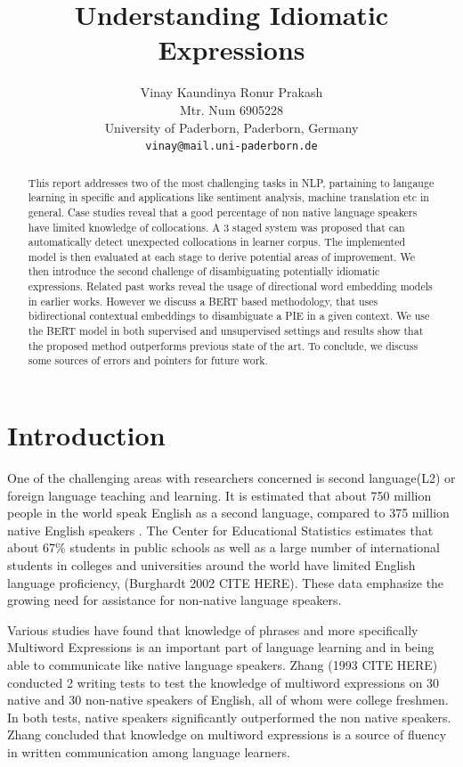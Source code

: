 \documentclass[11pt,a4paper]{article}
\title{Understanding Idiomatic Expressions}
\author{Vinay Kaundinya Ronur Prakash \\
  Mtr. Num 6905228 \\
  University of Paderborn, Paderborn, Germany \\
  \texttt{vinay@mail.uni-paderborn.de} \\}
\date{}
\begin{document}
\maketitle
\begin{abstract}
  This report addresses two of the most challenging tasks in NLP, partaining to langauge learning in specific and applications like sentiment analysis, machine translation etc in general.
  Case studies reveal that a good percentage of non native language speakers have limited knowledge of collocations. A 3 staged system was proposed that can automatically detect unexpected collocations in learner corpus. The implemented model is then evaluated at each stage to derive potential areas of improvement.
  We then introduce the second challenge of disambiguating potentially idiomatic expressions. Related past works reveal the usage of directional word embedding models in earlier works. However we discuss a BERT based methodology, that uses bidirectional contextual embeddings to disambiguate a PIE in a given context. 
  We use the BERT model in both supervised and unsupervised settings and results show that the proposed method outperforms previous state of the art. 
  To conclude, we discuss some sources of errors and pointers for future work.  
\end{abstract}

\section{Introduction}
One of the challenging areas with researchers concerned is second language(L2) or foreign language teaching and learning. It is estimated that about 750 million people in the world speak English as a second language, compared to 375 million native English speakers \cite{li-gaillat-2020-automatic}. 
The Center for Educational Statistics estimates that about 67$\%$ students in public schools as well as a large number of international students in colleges and universities around the world have limited English language proficiency, 
(Burghardt 2002 CITE HERE). These data emphasize the growing need for assistance for non-native language speakers.

Various studies have found that knowledge of phrases and more specifically Multiword Expressions is an important part of language learning and in being able to communicate like native language speakers. 
Zhang (1993 CITE HERE) conducted 2 writing tests to test the knowledge of multiword expressions on 30 native and 30 non-native speakers of English, all of whom were college freshmen. 
In both tests, native speakers significantly outperformed the non native speakers. Zhang concluded that knowledge on multiword expressions is a source of fluency in written communication among language learners. 
\end{document}
